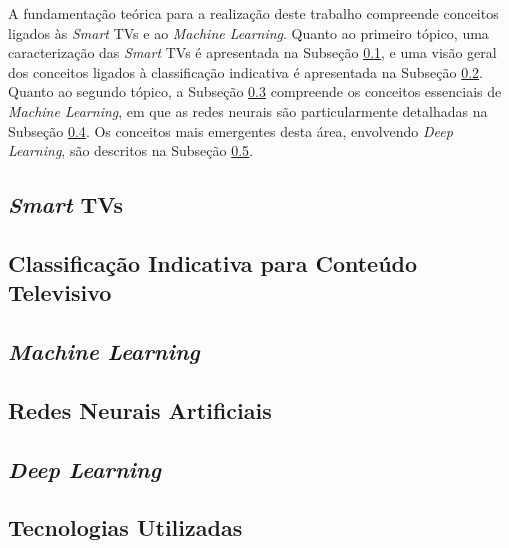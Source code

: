 
A fundamentação teórica para a realização deste trabalho compreende conceitos ligados às  \emph{Smart} TVs e ao \emph{Machine Learning}. Quanto ao primeiro tópico, uma caracterização das \emph{Smart} TVs é apresentada na Subseção \ref{sec:smarttv}, e uma visão geral dos conceitos ligados à classificação indicativa é apresentada na Subseção \ref{sec:classificacaoIndicativa}. Quanto ao segundo tópico, a Subseção \ref{sec:machineLearning} compreende os conceitos essenciais de \emph{Machine Learning}, em que as redes neurais são particularmente detalhadas na Subseção \ref{sec:rnas}. Os conceitos mais emergentes desta área, envolvendo \emph{Deep Learning}, são descritos na Subseção \ref{sec:dl}.

\subsection{\emph{Smart} TVs} \label{sec:smarttv}


\subsection{Classificação Indicativa para Conteúdo Televisivo} \label{sec:classificacaoIndicativa}


\subsection{\emph{Machine Learning}} \label{sec:machineLearning}


\subsection{Redes Neurais Artificiais} \label{sec:rnas}


\subsection{\emph{Deep Learning}}\label{sec:dl}


\subsection{Tecnologias Utilizadas}\label{sec:tecs}


